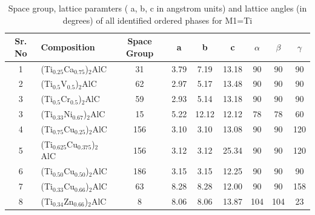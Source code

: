 \documentclass[preprint,amsmath,amssymb,aps, prb,showkeys]{revtex4-1}
\begin{document}
\begin{table}[htp!]
\centering
\setlength{\tabcolsep}{0.2cm}
\setlength\extrarowheight{6pt}
\begin{tabular}{clccccccc}
\hline
Sr. No & Composition                       & Space Group & a     & b     & c     & $\alpha$ & $\beta$ & $\gamma$ \\
\hline \hline
1      & (Ti$_{0.25}$Ca$_{0.75}$)$_2$AlC   & 31          & 3.79  & 7.19  & 13.18 & 90       & 90      & 90       \\
2      & (Ti${_0.5}$V${_0.5}$)$_2$AlC      & 62          & 2.97  & 5.17  & 13.48 & 90       & 90      & 90       \\
3	   & (Ti${_0.5}$Cr${_0.5}$)$_2$AlC     & 59          & 2.93  & 5.14  & 13.18 & 90       & 90      & 90       \\  
3      & (Ti$_{0.33}$Ni$_{0.67}$)$_2$AlC   & 15          & 5.22  & 12.12 & 12.12 & 78       & 78      & 60       \\
4      & (Ti$_{0.75}$Cu$_{0.25}$)$_2$AlC   & 156         & 3.10  & 3.10  & 13.08 & 90       & 90      & 120      \\
5      & (Ti$_{0.625}$Cu$_{0.375}$)$_2$AlC & 156         & 3.12  & 3.12  & 25.34 & 90       & 90      & 120      \\
6      & (Ti$_{0.50}$Cu$_{0.50}$)$_2$AlC   & 186         & 3.15  & 3.15 & 12.25  & 90       & 90      & 90       \\
7      & (Ti$_{0.33}$Cu$_{0.66}$)$_2$AlC   & 63          & 8.28  & 8.28 & 12.00  & 90       & 90      & 158      \\
8      & (Ti$_{0.34}$Zn$_{0.66}$)$_2$AlC   & 8           & 8.06  & 8.06  & 13.87 & 104      & 104     & 23       \\

\hline \hline
\end{tabular}
\caption{Space group, lattice paramters ( a, b, c in angstrom units) and lattice angles (in degrees)  of all identified ordered phases for M1=Ti}
\end{table}
\end{document}
